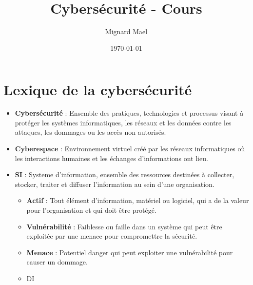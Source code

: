\documentclass[a4paper,12pt]{article}
\title{Cybersécurité - Cours}
\author{Mignard Mael}
\date{\today}
\begin{document}
\maketitle

\section{Lexique de la cybersécurité}
\begin{itemize}
    \item \textbf{Cybersécurité} : Ensemble des pratiques, technologies et processus visant à protéger les systèmes informatiques, les réseaux et les données contre les attaques, les dommages ou les accès non autorisés.\\
    \item \textbf{Cyberespace} : Environnement virtuel créé par les réseaux informatiques où les interactions humaines et les échanges d'informations ont lieu.\\
    \item \textbf{SI} : Systeme d'information, ensemble des ressources destinées à collecter, stocker, traiter et diffuser l'information au sein d'une organisation.\\
    \begin{itemize}
        \item \textbf{Actif} : Tout élément d'information, matériel ou logiciel, qui a de la valeur pour l'organisation et qui doit être protégé.
        \item \textbf{Vulnérabilité} : Faiblesse ou faille dans un système qui peut être exploitée par une menace pour compromettre la sécurité.
        \item \textbf{Menace} : Potentiel danger qui peut exploiter une vulnérabilité pour causer un dommage.
        \item DI
    \end{itemize}
\end{itemize}
\end{document}
